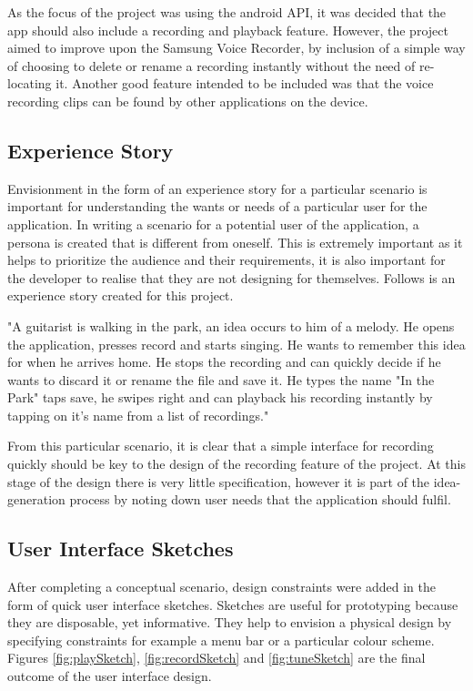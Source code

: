 \documentclass[conference]{acmsiggraph}
\begin{document}
As the focus of the project was using the android API, it was decided that the app should also include a recording and playback feature. However, the project aimed to improve upon the Samsung Voice Recorder, by inclusion of a simple way of choosing to delete or rename a recording instantly without the need of re-locating it. Another good feature intended to be included was that the voice recording clips can be found by other applications on the device. 

\subsection{Experience Story}

Envisionment in the form of an experience story for a particular scenario is important for understanding the wants or needs of a particular user for the application. In writing a scenario for a potential user of the application, a persona is created that is different from oneself. This is extremely important as it helps to prioritize the audience and their requirements, it is also important for the developer to realise that they are not designing for themselves. Follows is an experience story created for this project.

"A guitarist is walking in the park, an idea occurs to him of a melody. He opens the application, presses record and starts singing. He wants to remember this idea for when he arrives home. He stops the recording and can quickly decide if he wants to discard it or rename the file and save it. He types the name "In the Park" taps save, he swipes right and can playback his recording instantly by tapping on it's name from a list of recordings." 

From this particular scenario, it is clear that a simple interface for recording quickly should be key to the design of the recording feature of the project. At this stage of the design there is very little specification, however it is part of the idea-generation process by noting down user needs that the application should fulfil.

\subsection{User Interface Sketches}

After completing a conceptual scenario, design constraints were added in the form of quick user interface sketches. Sketches are useful for prototyping because they are disposable, yet informative. They help to envision a physical design by specifying constraints for example a menu bar or a particular colour scheme. Figures \ref{fig:playSketch}, \ref{fig:recordSketch} and \ref{fig:tuneSketch} are the final outcome of the user interface design.
\end{document}
